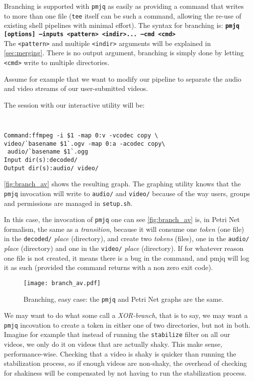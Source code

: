 \documentclass[letterpaper,twocolumn,10pt]{article}
\begin{document}
Branching is supported with {\tt pmjq} as easily as providing a command that writes to more than one file ({\tt tee} itself can be such a command, allowing the re-use of existing shell pipelines with minimal effort). The syntax for branching  is:
   {\bf \tt pmjq [options] --inputs <pattern> <indir>... --cmd <cmd> \\}
   The {\tt <pattern>} and multiple {\tt <indir>} arguments will be explained in \autoref{sec:merging}. There is no output argument, branching is simply done by letting {\tt <cmd>} write to multiple directories.

   Assume for example that we want to modify our pipeline to separate the audio and video streams of our user-submitted videos. 

   The session with our interactive utility will be:
{\tt \small
\begin{verbatim}
Command:ffmpeg -i $1 -map 0:v -vcodec copy \
video/`basename $1`.ogv -map 0:a -acodec copy\
 audio/`basename $1`.ogg
Input dir(s):decoded/
Output dir(s):audio/ video/
\end{verbatim}
}

\autoref{fig:branch_av} shows the resulting graph. The graphing utility knows that the {\tt pmjq} invocation will write to {\tt audio/} and {\tt video/} because of the way users, groups and permissions are managed in {\tt setup.sh}.

In this case, the invocation of {\tt pmjq} one can see \autoref{fig:branch_av} is, in Petri Net formalism, the same as a \emph{transition}, because it will consume one \emph{token} (one file) in the {\tt decoded/} \emph{place} (directory), and create two \emph{tokens} (files), one in the {\tt audio/} \emph{place} (directory) and one in the {\tt video/} \emph{place} (directory). If for whatever reason one file is not created, it means there is a bug in the command, and pmjq will log it as such (provided the command returns with a non zero exit code).

\begin{figure}[t]
\begin{center}
\texttt{[image: branch\_av.pdf]}
\end{center}
\caption{Branching, easy case: the {\tt pmjq} and Petri Net graphs are the same.}
\label{fig:branch_av}
\end{figure}

We may want to do what some call a \emph{XOR-branch}, that is to say, we may want a {\tt pmjq} incovation to create a token in either one of two directories, but not in both. Imagine for example that instead of running the {\tt stabilize} filter on all our videos, we only do it on videos that are actually shaky. This make sense, performance-wise. Checking that a video is shaky is quicker than running the stabilization process, so if enough videos are non-shaky, the overhead of checking for shakiness will be compensated by not having to run the stabilization process.
\end{document}
